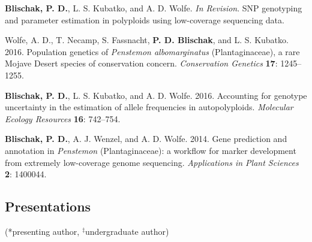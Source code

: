 \documentclass[]{article}
\begin{document}
\begin{etaremune}

\item
  \textbf{Blischak, P. D.}, L. S. Kubatko, and A. D. Wolfe. \textit{In Revision}.
  SNP genotyping and parameter estimation in polyploids using low-coverage sequencing data.

\item
  Wolfe, A. D., T. Necamp, S. Fassnacht, \textbf{P. D. Blischak}, and L. S. Kubatko. 2016.
  Population genetics of \textit{Penstemon albomarginatus} (Plantaginaceae),
  a rare Mojave Desert species of conservation concern. \textit{Conservation Genetics} \textbf{17}: 1245--1255.

\item
  \textbf{Blischak, P. D.}, L. S. Kubatko, and A. D. Wolfe. 2016.
  Accounting for genotype uncertainty in the estimation of allele
  frequencies in autopolyploids. \emph{Molecular Ecology Resources} \textbf{16}:
  742--754.
\item
  \textbf{Blischak, P. D.}, A. J. Wenzel, and A. D. Wolfe. 2014. Gene
  prediction and annotation in \textit{Penstemon} (Plantaginaceae): a
  workflow for marker development from extremely low-coverage genome
  sequencing. \emph{Applications in Plant Sciences} \textbf{2}: 1400044.
\end{etaremune}

\subsection{\texorpdfstring{\textbf{Presentations}}{Presentations}}\label{presentations}

(*presenting author, \(^{\ddagger}\)undergraduate author)
\end{document}
